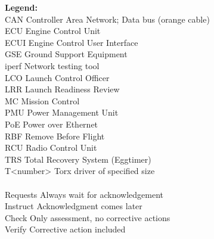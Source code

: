 \begin{tcolorbox}
\color{black}

\textbf{Legend:}\\
CAN \underlined Controller Area Network; Data bus (orange cable)\\
ECU \underlined Engine Control Unit\\
ECUI \underlined Engine Control User Interface\\
GSE \underlined Ground Support Equipment\\
iperf \underlined Network testing tool\\
LCO \underlined Launch Control Officer\\
LRR \underlined Launch Readiness Review\\
MC \underlined Mission Control\\
PMU \underlined Power Management Unit\\
PoE \underlined Power over Ethernet\\
RBF \underlined Remove Before Flight\\
RCU \underlined Radio Control Unit\\
TRS \underlined Total Recovery System (Eggtimer)\\
T<number> \underlined Torx driver of specified size\\\\

Requests \underlined Always wait for acknowledgement\\
Instruct \underlined Acknowledgment comes later\\
Check \underlined Only assessment, no corrective actions\\
Verify \underlined Corrective action included
\end{tcolorbox}
